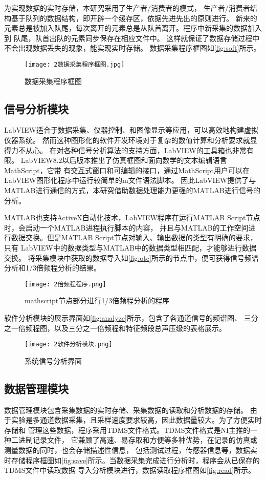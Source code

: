 为实现数据的实时存储，本研究采用了生产者/消费者的模式，
生产者/消费者结构基于队列的数据结构，即开辟一个缓存区，依据先进先出的原则进行\cite{马瑾2015基于}。
新来的元素总是被加入队尾，每次离开的元素总是从队首离开。程序中新采集的数据加入到
队尾，队首出队的元素同步保存在相应文件中。
这样就保证了数据存储过程中不会出现数据丢失的现象，能实现实时存储。
数据采集程序框图如\autoref{fig:soft}所示。
\begin{figure}[htbp]
    \centering
    \texttt{[image: 2数据采集程序框图.jpg]}
    \caption{\label{fig:soft}数据采集程序框图}
\end{figure}


\subsection{信号分析模块}
LabVIEW适合于数据采集、仪器控制、和图像显示等应用，可以高效地构建虚拟仪器系统。
然而这种图形化的软件开发环境对于复杂的数值计算和分析要求就显得力不从心。
在对各种信号分析算法的支持方面，LabVIEW的工具箱也非常有限。
LabVIEW8.2以后版本推出了仿真框图和面向数学的文本编辑语言MathScript，它带
有交互式窗口和可编辑的接口，通过MathScript用户可以在LabVIEW图形化程序中运行较简单的m文件语法脚本\cite{周惠2007LabVIEW,柴敬安2008Labview}。
因此LabVIEW提供了与MATLAB进行通信的方式，本研究借助数据处理能力更强的MATLAB进行信号的分析。

MATLAB也支持ActiveX自动化技术，LabVIEW程序在运行MATLAB Script节点时，会启动一个MATLAB进程执行脚本的内容，
并且与MATLAB的工作空间进行数据交换。但是MATLAB Script节点对输入、输出数据的类型有明确的要求，只有
LabVIEW中的数据类型与MATLAB中的数据类型相匹配，才能够进行数据交换\cite{苏宝定2008基于}。
将采集模块中获取的数据导入如\autoref{fig:otc}所示的节点中，便可获得信号频谱分析和1/3倍频程分析的结果。
\begin{figure}[htbp]
    \centering
    \texttt{[image: 2倍频程程序.png]}
    \caption{\label{fig:otc}mathscript节点部分进行1/3倍频程分析的程序}
\end{figure}

软件分析模块的展示界面如\autoref{fig:analyze}所示，包含了各通道信号的频谱图、
三分之一倍频程图，以及三分之一倍频程和特征频段总声压级的表格展示。
\begin{figure}[htbp]
    \centering
    \texttt{[image: 2软件分析模块.png]}
    \caption{\label{fig:analyze}系统信号分析界面}
\end{figure}

\subsection{数据管理模块}
数据管理模块包含采集数据的实时存储、采集数据的读取和分析数据的存储。
由于实验是多通道数据采集，且采样速度要求较高，因此数据量较大。为了方便实时存储和
管理这些数据，程序采用TDMS文件格式。TDMS文件格式是NI主推的一种二进制记录文件，
它兼顾了高速、易存取和方便等多种优势，在记录的仿真或测量数据的同时，也会存储描述性信息，
包括测试过程，传感器信息等，数据实时存储程序框图如\autoref{fig:save}所示。当数据采集完成进行分析时，程序会从已保存的TDMS文件中读取数据
导入分析模块进行，数据读取程序框图如\autoref{fig:read}所示。

